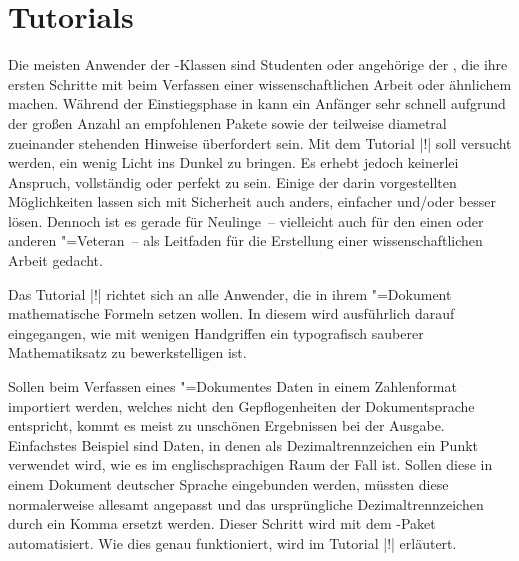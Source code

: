 \chapter{Tutorials}
%

%
%
%
Die meisten Anwender der \TUDScript-Klassen sind Studenten oder angehörige der 
\TnUD, die ihre ersten Schritte mit  beim Verfassen einer 
wissenschaftlichen Arbeit oder ähnlichem machen. Während der Einstiegsphase in 
 kann ein Anfänger sehr schnell aufgrund der großen Anzahl an 
empfohlenen Pakete sowie der teilweise diametral zueinander stehenden Hinweise 
überfordert sein. Mit dem Tutorial |!| soll versucht werden, 
ein wenig Licht ins Dunkel zu bringen. Es erhebt jedoch keinerlei Anspruch, 
vollständig oder perfekt zu sein. Einige der darin vorgestellten Möglichkeiten 
lassen sich mit Sicherheit auch anders, einfacher und/oder besser lösen. 
Dennoch ist es gerade für Neulinge~-- vielleicht auch für den einen oder 
anderen "=Veteran~-- als Leitfaden für die Erstellung einer 
wissenschaftlichen Arbeit gedacht.

%
%
%
Das Tutorial |!| richtet sich an alle Anwender, die in ihrem 
"=Dokument mathematische Formeln setzen wollen. In diesem wird 
ausführlich darauf eingegangen, wie mit wenigen Handgriffen ein typografisch 
sauberer Mathematiksatz zu bewerkstelligen ist.

%
%
%
%
Sollen beim Verfassen eines "=Dokumentes Daten in einem 
Zahlenformat importiert werden, welches nicht den Gepflogenheiten der 
Dokumentsprache entspricht, kommt es meist zu unschönen Ergebnissen bei der 
Ausgabe. Einfachstes Beispiel sind Daten, in denen als Dezimaltrennzeichen ein 
Punkt verwendet wird, wie es im englischsprachigen Raum der Fall ist. Sollen 
diese in einem Dokument deutscher Sprache eingebunden werden, müssten diese 
normalerweise allesamt angepasst und das ursprüngliche Dezimaltrennzeichen 
durch ein Komma ersetzt werden. Dieser Schritt wird mit dem \TUDScript-Paket 
 automatisiert. Wie dies genau funktioniert, wird im Tutorial 
|!| erläutert.
%
